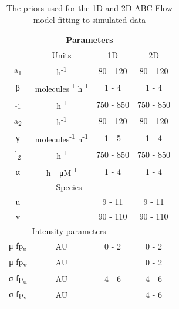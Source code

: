 \begin{table}[tb]
\centering
\caption{The priors used for the 1D and 2D ABC-Flow model fitting to simulated data}
\label{tab:priors_model}

\begin{tabular}{@{}cccc@{}}
\toprule
\multicolumn{4}{c}{Parameters}                                         \\ \midrule
\multicolumn{1}{c}{} & Units  &\multicolumn{1}{c}{1D} & \multicolumn{1}{c}{2D} \\ \midrule
a\textsubscript{1}       &     h\textsuperscript{-1}        & 80 - 120               & 80 - 120               \\
β                   & molecules\textsuperscript{-1} h\textsuperscript{-1} &1 - 4                  & 1 - 4                  \\
l\textsubscript{1}   &    h\textsuperscript{-1}           & 750 - 850              & 750 - 850              \\
a\textsubscript{2}    &  h\textsuperscript{-1}               & 80 - 120               & 80 - 120               \\
γ                &molecules\textsuperscript{-1} h\textsuperscript{-1}   & 1 - 5                  & 1 - 4                  \\
l\textsubscript{2}       &    h\textsuperscript{-1}             & 750 - 850              & 750 - 850              \\
α                  &    h\textsuperscript{-1} μM\textsuperscript{-1} & 1 - 4                  & 1 - 4                  \\ \midrule
\multicolumn{3}{c}{Species}                                            \\ \midrule
u                 &   & 9 - 11                 & 9 - 11                 \\
v                 &   & 90 - 110               & 90 - 110               \\ \midrule
\multicolumn{3}{c}{Intensity parameters}                               \\ \midrule
μ fp\textsubscript{u}    &AU         & 0 - 2                  & 0 - 2                  \\
μ fp\textsubscript{v}     &AU        &                   & 0 - 2                  \\
σ fp\textsubscript{u}     &AU       & 4 - 6                  & 4 - 6                  \\
σ fp\textsubscript{v}     &AU       &                   & 4 - 6                  \\ \bottomrule
\end{tabular}

\end{table}




